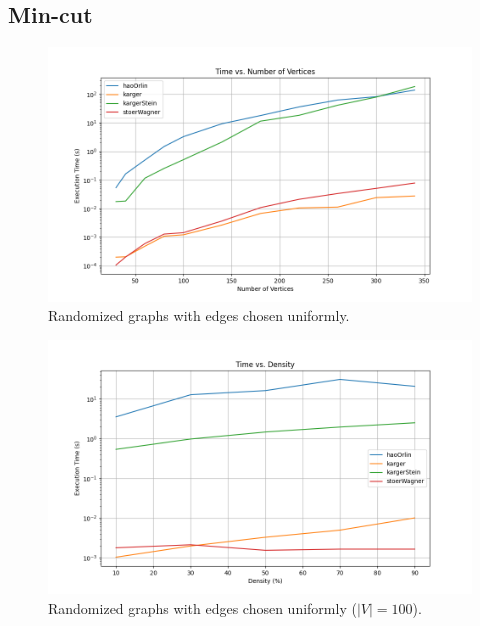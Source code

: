 \subsection{Min-cut}


\begin{figure}[H]
\centering
\includegraphics[width=\textwidth]{chapters/benchmark/Sections/images/min-cut/num_of_v/time_vs_vertices.png}
\caption{ Randomized graphs with edges chosen uniformly. }
\end{figure}

\begin{figure}[H]
\centering
\includegraphics[width=\textwidth]{chapters/benchmark/Sections/images/min-cut/density/time_vs_density.png}
\caption{ Randomized graphs with edges chosen uniformly (\(|V| = 100\)).}
\end{figure}

